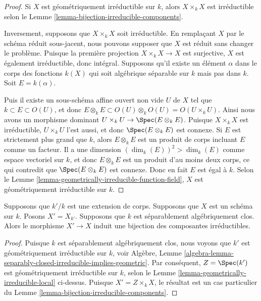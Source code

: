 \begin{proof}
Si $X$ est géométriquement irréductible sur $k$,
alors $X\times_k X$ est irréductible selon le
Lemme \ref{lemma-bijection-irreducible-components}.

\medskip\noindent
Inversement, supposons que $X \times_k X$ soit
irréductible. En remplaçant $X$ par le schéma réduit
sous-jacent, nous pouvons supposer que $X$ est réduit sans
changer le problème. Puisque la première projection $X
\times_k X \to X$ est surjective, $X$ est également
irréductible, donc intégral. Supposons qu'il existe un élément
$\alpha$ dans le corps des fonctions $k(X)$ qui soit
algébrique séparable sur $k$ mais pas dans $k$. Soit $E = k(\alpha)$.

\medskip\noindent
Puis il existe un sous-schéma affine ouvert non vide $U$ de $X$
tel que $k \subset E \subset O(U)$, et donc $E \otimes_k E
\subset O(U)\otimes_k O(U) = O(U\times_k U)$. Ainsi nous avons
un morphisme dominant $U \times_k U \to \Spec(E\otimes_k E)$.
Puisque $X\times_k X$ est irréductible, $U \times_k U$ l'est
aussi, et donc $\Spec(E \otimes_k E)$ est connexe. Si $E$ est
strictement plus grand que $k$, alors $E \otimes_k E$ est un
produit de corps incluant $E$ comme un facteur. Il a une
dimension $(\dim_k(E))^2>\dim_k(E)$ comme espace vectoriel sur
$k$, et donc $E\otimes_k E$ est un produit d'au moins deux corps,
ce qui contredit que $\Spec(E \otimes_k E)$ est connexe. Donc en
fait $E$ est égal à $k$. Selon le Lemme
\ref{lemma-geometrically-irreducible-function-field}, $X$ est géométriquement irréductible sur $k$.
\end{proof}

\begin{lemma}
\label{lemma-separably-closed-field-irreducible-components}
Supposons que $k'/k$ est une extension de corps. Supposons que
$X$ est un schéma sur $k$. Posons $X' = X_{k'}$. Supposons que
$k$ est séparablement algébriquement clos. Alors le morphisme
$X' \to X$ induit une bijection des composantes irréductibles.
\end{lemma}

\begin{proof}
Puisque $k$ est séparablement algébriquement clos, nous voyons que
$k'$ est géométriquement irréductible sur $k$, voir Algèbre, Lemme
\ref{algebra-lemma-separably-closed-irreducible-implies-geometric}.
Par conséquent, $Z = \Spec(k')$ est géométriquement irréductible
sur $k$, selon le Lemme
\ref{lemma-geometrically-irreducible-local} ci-dessus. Puisque $X' = Z \times_k X$, le
résultat est un cas particulier du Lemme \ref{lemma-bijection-irreducible-components}.
\end{proof}

